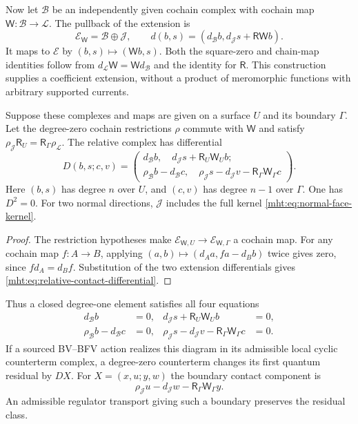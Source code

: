 Now let $\mathcal B$ be an independently given cochain complex
with cochain map $\mathsf W:\mathcal B\to\mathcal L$.
The pullback of the extension is
\[
 \mathcal E_{\mathsf W}=\mathcal B\oplus\mathcal J,
 \qquad d(b,s)=(d_{\mathcal B}b,d_{\mathcal J}s+\mathsf R\mathsf Wb).
\]
It maps to $\mathcal E$ by $(b,s)\mapsto(\mathsf Wb,s)$.
Both the square-zero and chain-map identities follow from
$d_{\mathcal L}\mathsf W=\mathsf Wd_{\mathcal B}$ and the identity
for $\mathsf R$. This construction supplies a coefficient extension,
without a product of meromorphic functions with arbitrary supported
currents.

\begin{proposition}\label{mht:prop:relative-contact-totalization}
Suppose these complexes and maps are given on a surface $U$ and its
boundary $\Gamma$. Let the degree-zero cochain restrictions $\rho$
commute with $\mathsf W$ and satisfy
$\rho_{\mathcal J}\mathsf R_U=\mathsf R_\Gamma\rho_{\mathcal L}$.
The relative complex has differential
\begin{equation}\label{mht:eq:relative-contact-differential}
 D(b,s;c,v)=
 \left(
 \begin{array}{c}
 d_{\mathcal B}b,\quad d_{\mathcal J}s+\mathsf R_U\mathsf W_Ub;\\
 \rho_{\mathcal B}b-d_{\mathcal B}c,\quad
 \rho_{\mathcal J}s-d_{\mathcal J}v
                         -\mathsf R_\Gamma\mathsf W_\Gamma c
 \end{array}\right).
\end{equation}
Here $(b,s)$ has degree $n$ over $U$, and $(c,v)$ has degree
$n-1$ over $\Gamma$. One has $D^2=0$.
For two normal directions, $\mathcal J$ includes the full kernel
\eqref{mht:eq:normal-face-kernel}.
\end{proposition}

\begin{proof}
The restriction hypotheses make
$\mathcal E_{\mathsf W,U}\to\mathcal E_{\mathsf W,\Gamma}$ a
cochain map. For any cochain map $f:A\to B$, applying
$(a,b)\mapsto(d_Aa,fa-d_Bb)$ twice gives zero, since
$fd_A=d_Bf$. Substitution of the two extension differentials
gives \eqref{mht:eq:relative-contact-differential}.
\end{proof}

Thus a closed degree-one element satisfies all four equations
\[
 \begin{aligned}
 d_{\mathcal B}b&=0,&
 d_{\mathcal J}s+\mathsf R_U\mathsf W_Ub&=0,\\
 \rho_{\mathcal B}b-d_{\mathcal B}c&=0,&
 \rho_{\mathcal J}s-d_{\mathcal J}v
                        -\mathsf R_\Gamma\mathsf W_\Gamma c&=0.
 \end{aligned}
\]
If a sourced BV--BFV action realizes this diagram
in its admissible local cyclic counterterm complex, a degree-zero
counterterm changes its first quantum residual by $DX$.
For $X=(x,u;y,w)$ the boundary contact component is
\[
 \rho_{\mathcal J}u-d_{\mathcal J}w
                       -\mathsf R_\Gamma\mathsf W_\Gamma y.
\]
An admissible regulator transport giving such a boundary preserves
the residual class.

